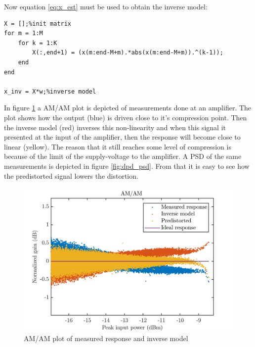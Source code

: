 Now equation \ref{eq:x_est} must be used to obtain the inverse model:

\begin{lstlisting}[frame = single]
X = [];%init matrix
for m = 1:M
    for k = 1:K
        X(:,end+1) = (x(m:end-M+m).*abs(x(m:end-M+m)).^(k-1));
    end
end

x_inv = X*w;%inverse model
\end{lstlisting}


In figure \ref{fig:dpd_amam} a AM/AM plot is depicted of measurements done at an amplifier. The plot shows how the output (blue) is driven close to it's compression point. Then the inverse model (red) inverses this non-linearity and when this signal it presented at the input of the amplifier, then the response will become close to linear (yellow). The reason that it still reaches some level of compression is because of the limit of the supply-voltage to the amplifier. A PSD of the same measurements is depicted in figure \ref{fig:dpd_psd}. From that it is easy to see how the predistorted signal lowers the distortion. 


\begin{figure}[H]
\centering 
\includegraphics[scale = 0.7]{figures/measurement/predis.png}
\caption{AM/AM plot of measured response and inverse model}
\label{fig:dpd_amam}
\end{figure}

